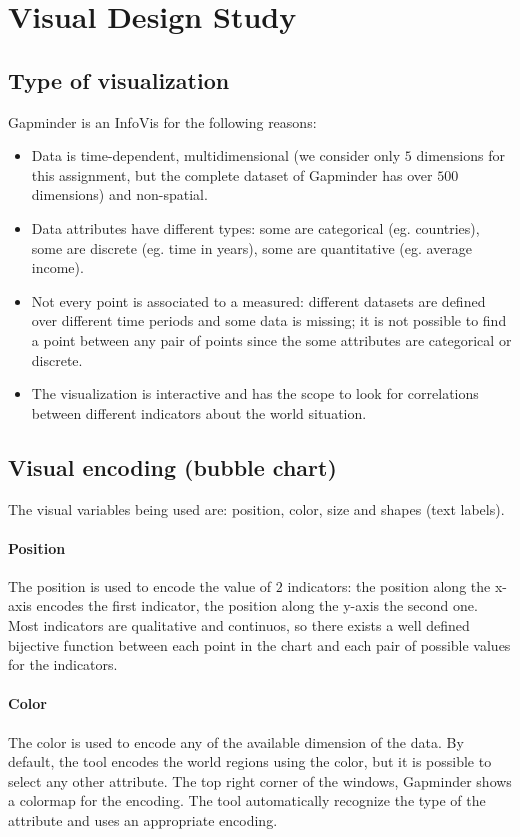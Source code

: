 \section{Visual Design Study}
\label{sec:visual_design}

\subsection{Type of visualization}
Gapminder is an InfoVis for the following reasons:
\begin{itemize}
    \item Data is time-dependent, multidimensional (we consider only $5$ dimensions for this assignment, but the complete dataset of Gapminder has over $500$ dimensions) and non-spatial.
    \item Data attributes have different types: some are categorical (eg. countries), some are discrete (eg. time in years), some are quantitative (eg. average income). 
    \item Not every point is associated to a measured: different datasets are defined over different time periods and some data is missing; it is not possible to find a point between any pair of points since the some attributes are categorical or discrete.
    \item The visualization is interactive and has the scope to look for correlations between different indicators about the world situation.
\end{itemize}

\subsection{Visual encoding (bubble chart)}
The visual variables being used are: position, color, size and shapes (text labels).

\paragraph{Position}
The position is used to encode the value of $2$ indicators: the position along the x-axis encodes the first indicator, the position along the y-axis the second one.
Most indicators are qualitative and continuos, so there exists a well defined bijective function between each point in the chart and each pair of possible values for the indicators.


\paragraph{Color}
The color is used to encode any of the available dimension of the data.
By default, the tool encodes the world regions using the color, but it is possible to select any other attribute.
The top right corner of the windows, Gapminder shows a colormap for the encoding.
The tool automatically recognize the type of the attribute and uses an appropriate encoding.

